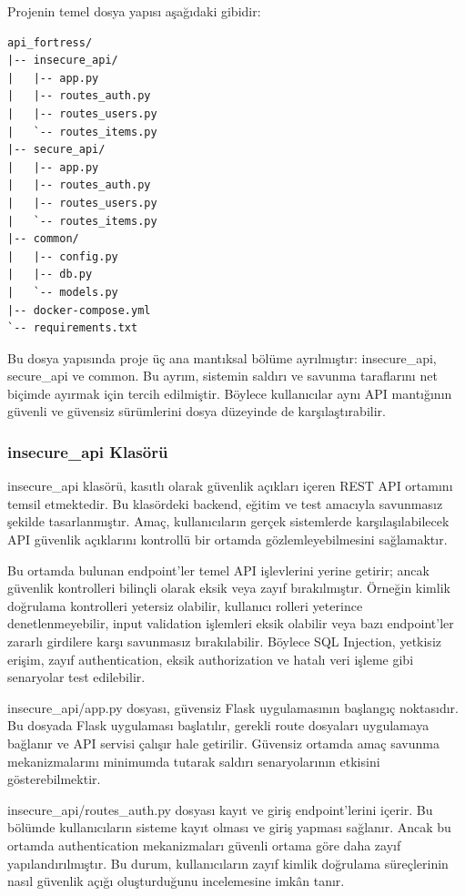 Projenin temel dosya yapısı aşağıdaki gibidir:

\begin{verbatim}
api_fortress/
|-- insecure_api/
|   |-- app.py
|   |-- routes_auth.py
|   |-- routes_users.py
|   `-- routes_items.py
|-- secure_api/
|   |-- app.py
|   |-- routes_auth.py
|   |-- routes_users.py
|   `-- routes_items.py
|-- common/
|   |-- config.py
|   |-- db.py
|   `-- models.py
|-- docker-compose.yml
`-- requirements.txt
\end{verbatim}

Bu dosya yapısında proje üç ana mantıksal bölüme ayrılmıştır: insecure\_api, secure\_api ve common. Bu ayrım, sistemin saldırı ve savunma taraflarını net biçimde ayırmak için tercih edilmiştir. Böylece kullanıcılar aynı API mantığının güvenli ve güvensiz sürümlerini dosya düzeyinde de karşılaştırabilir.

\subsubsection{insecure\_api Klasörü}

insecure\_api klasörü, kasıtlı olarak güvenlik açıkları içeren REST API ortamını temsil etmektedir. Bu klasördeki backend, eğitim ve test amacıyla savunmasız şekilde tasarlanmıştır. Amaç, kullanıcıların gerçek sistemlerde karşılaşılabilecek API güvenlik açıklarını kontrollü bir ortamda gözlemleyebilmesini sağlamaktır.

Bu ortamda bulunan endpoint’ler temel API işlevlerini yerine getirir; ancak güvenlik kontrolleri bilinçli olarak eksik veya zayıf bırakılmıştır. Örneğin kimlik doğrulama kontrolleri yetersiz olabilir, kullanıcı rolleri yeterince denetlenmeyebilir, input validation işlemleri eksik olabilir veya bazı endpoint’ler zararlı girdilere karşı savunmasız bırakılabilir. Böylece SQL Injection, yetkisiz erişim, zayıf authentication, eksik authorization ve hatalı veri işleme gibi senaryolar test edilebilir.

insecure\_api/app.py dosyası, güvensiz Flask uygulamasının başlangıç noktasıdır. Bu dosyada Flask uygulaması başlatılır, gerekli route dosyaları uygulamaya bağlanır ve API servisi çalışır hale getirilir. Güvensiz ortamda amaç savunma mekanizmalarını minimumda tutarak saldırı senaryolarının etkisini gösterebilmektir.

insecure\_api/routes\_auth.py dosyası kayıt ve giriş endpoint’lerini içerir. Bu bölümde kullanıcıların sisteme kayıt olması ve giriş yapması sağlanır. Ancak bu ortamda authentication mekanizmaları güvenli ortama göre daha zayıf yapılandırılmıştır. Bu durum, kullanıcıların zayıf kimlik doğrulama süreçlerinin nasıl güvenlik açığı oluşturduğunu incelemesine imkân tanır.

